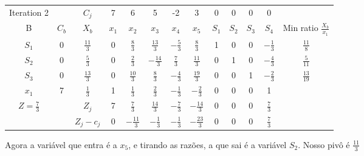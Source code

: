 \documentclass[11pt]{article}
\begin{document}
\begin{center}
\begin{tabular}{c c c c c c c c c c c c c}
Iteration 2 &  & \(C_j\) & 7 & 6 & 5 & -2 & 3 & 0 & 0 & 0 & 0 & \\
B & \(C_b\) & \(X_b\) & \(x_1\) & \(x_2\) & \(x_3\) & \(x_4\) & \(x_5\) & \(S_1\) & \(S_2\) & \(S_3\) & \(S_4\) & Min ratio \(\frac{X_b}{x_1}\)\\
\(S_1\) & 0 & \(\frac{11}{3}\) & 0 & \(\frac{8}{3}\) & \(\frac{13}{3}\) & \(-\frac{5}{3}\) & \(\frac{8}{3}\) & 1 & 0 & 0 & \(-\frac{1}{3}\) & \(\frac{11}{8}\)\\
\(S_2\) & 0 & \(\frac{5}{3}\) & 0 & \(\frac{2}{3}\) & \(-\frac{14}{3}\) & \(\frac{7}{3}\) & \(\frac{11}{3}\) & 0 & 1 & 0 & \(-\frac{4}{3}\) & \(\frac{5}{11}\)\\
\(S_3\) & 0 & \(\frac{13}{3}\) & 0 & \(\frac{10}{3}\) & \(\frac{8}{3}\) & \(-\frac{4}{3}\) & \(\frac{19}{3}\) & 0 & 0 & 1 & \(-\frac{2}{3}\) & \(\frac{13}{19}\)\\
\(x_1\) & 7 & \(\frac{1}{3}\) & 1 & \(\frac{1}{3}\) & \(\frac{2}{3}\) & \(-\frac{1}{3}\) & \(-\frac{2}{3}\) & 0 & 0 & 0 & 1 & \\
\(Z=\frac{7}{3}\) &  & \(Z_j\) & 7 & \(\frac{7}{3}\) & \(\frac{14}{3}\) & \(-\frac{7}{3}\) & \(-\frac{14}{3}\) & 0 & 0 & 0 & \(\frac{7}{3}\) & \\
 &  & \(Z_j-c_j\) & 0 & \(-\frac{11}{3}\) & \(-\frac{1}{3}\) & \(-\frac{1}{3}\) & \(-\frac{23}{3}\) & 0 & 0 & 0 & \(\frac{7}{3}\) & \\
\end{tabular}
\end{center}

Agora a variável que entra é a \(x_5\), e tirando as razões, a que sai é a variável \(S_2\). Nosso pivô é \(\frac{11}{3}\)
\end{document}
